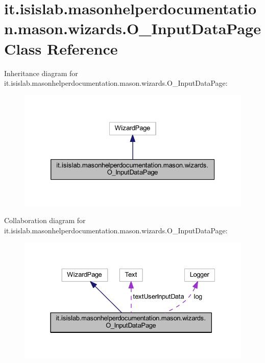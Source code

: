 \hypertarget{classit_1_1isislab_1_1masonhelperdocumentation_1_1mason_1_1wizards_1_1_o___input_data_page}{\section{it.\-isislab.\-masonhelperdocumentation.\-mason.\-wizards.\-O\-\_\-\-Input\-Data\-Page Class Reference}
\label{classit_1_1isislab_1_1masonhelperdocumentation_1_1mason_1_1wizards_1_1_o___input_data_page}
}


Inheritance diagram for it.\-isislab.\-masonhelperdocumentation.\-mason.\-wizards.\-O\-\_\-\-Input\-Data\-Page\-:\nopagebreak
\begin{figure}[H]
\begin{center}
\leavevmode
\includegraphics[width=326pt]{classit_1_1isislab_1_1masonhelperdocumentation_1_1mason_1_1wizards_1_1_o___input_data_page__inherit__graph}
\end{center}
\end{figure}


Collaboration diagram for it.\-isislab.\-masonhelperdocumentation.\-mason.\-wizards.\-O\-\_\-\-Input\-Data\-Page\-:\nopagebreak
\begin{figure}[H]
\begin{center}
\leavevmode
\includegraphics[width=331pt]{classit_1_1isislab_1_1masonhelperdocumentation_1_1mason_1_1wizards_1_1_o___input_data_page__coll__graph}
\end{center}
\end{figure}
